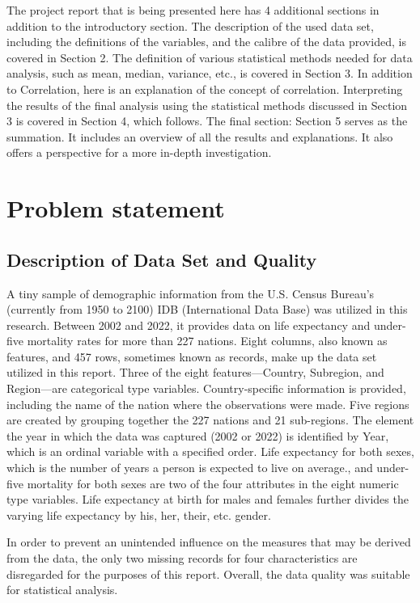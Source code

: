 \documentclass[12 pt]{scrartcl}
\begin{document}
The project report that is being presented here has 4 additional sections in addition to the introductory section. The description of the used data set, including the definitions of the variables, and the calibre of the data provided, is covered in Section 2. The definition of various statistical methods needed for data analysis, such as mean, median, variance, etc., is covered in Section 3. In addition to Correlation, here is an explanation of the concept of correlation. Interpreting the results of the final analysis using the statistical methods discussed in Section 3 is covered in Section 4, which follows. The final section: Section 5 serves as the summation. It includes an overview of all the results and explanations. It also offers a perspective for a more in-depth investigation.



\section{Problem statement}

\subsection{Description of Data Set and Quality}

 A tiny sample of demographic information from the U.S. Census Bureau's (currently from 1950 to 2100) IDB (International Data Base) was utilized in this research. Between 2002 and 2022, it provides data on life expectancy and under-five mortality rates for more than 227 nations. Eight columns, also known as features, and 457 rows, sometimes known as records, make up the data set utilized in this report. Three of the eight features—Country, Subregion, and Region—are categorical type variables. Country-specific information is provided, including the name of the nation where the observations were made. Five regions are created by grouping together the 227 nations and 21 sub-regions. The element the year in which the data was captured (2002 or 2022) is identified by Year, which is an ordinal variable with a specified order. Life expectancy for both sexes, which is the number of years a person is expected to live on average., and under-five mortality for both sexes are two of the four attributes in the eight numeric type variables. Life expectancy at birth for males and females further divides the varying life expectancy by his, her, their, etc. gender.\citep{Glossary}
 
In order to prevent an unintended influence on the measures that may be derived from the data, the only two missing records for four characteristics are disregarded for the purposes of this report. Overall, the data quality was suitable for statistical analysis. 
\end{document}

